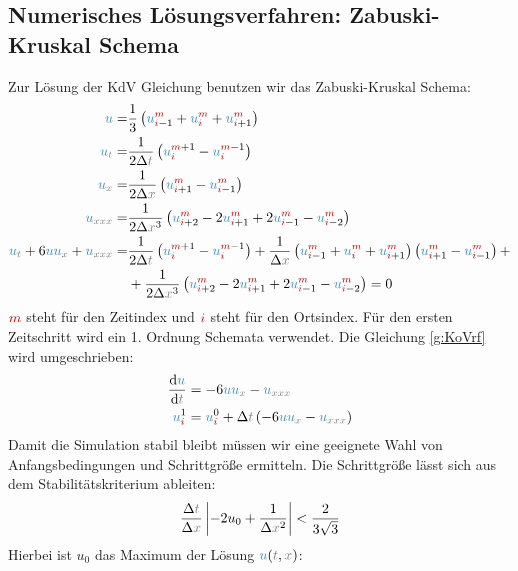 \documentclass[10pt,fleqn,%
reqno,a4paper]{article}
\makeatletter
\def\mathcolor#1#{\@mathcolor{#1}}
\def\@mathcolor#1#2#3{%
        \protect\leavevmode
        \begingroup\color#1{#2}#3\endgroup
}
\newcommand{\nx}{\mathcolor{gray}{x}}
\newcommand{\nt}{\mathcolor{gray}{t}}
\newcommand{\nnu}{\mathcolor{cyan!70!black}{u}}
\newcommand{\nni}{\mathcolor{red!70!black}{i}}
\newcommand{\nm}{\mathcolor{red!70!black}{m}}
\newcommand{\dif}{\mathrm{d}}
\makeatother
\begin{document}
\subsection{Numerisches Lösungsverfahren: Zabuski-Kruskal Schema}
Zur Lösung der KdV Gleichung benutzen wir das Zabuski-Kruskal Schema:
\begin{align}
        \nnu =& \frac{1}{3} \left(\nnu{_{\nni-1} ^{\nm}} + \nnu{_{\nni}^{\nm}} + \nnu{_{\nni+1}^{\nm}} \right) \nonumber\\
        \nnu_{\nt}=& \frac{1}{2\Delta \nt} \left(\nnu{_{\nni}^{\nm+1}} - \nnu{_{\nni}^{\nm-1}} \right) \nonumber\\
        \nnu_{\nx} = &\frac{1}{2\Delta \nx} \left(\nnu{_{\nni+1}^{\nm}} - \nnu{_{\nni-1}^{\nm}} \right) \nonumber\\
        \nnu _{\nx \nx \nx } =& \frac{1}{2\Delta \nx^3} \left(\nnu{_{\nni+2}^{\nm}} - 2\nnu{_{\nni+1}^{\nm}} + 2\nnu{_{\nni-1}^{\nm}}- \nnu{_{\nni-2}^{\nm}} \right) \nonumber \\
        \nnu _{\nt} + 6\nnu \nnu _{\nx} + \nnu _{\nx \nx \nx} = & \frac{1}{2\Delta \nt}  \left(\nnu{_{\nni}^{\nm+1}} - \nnu{_{\nni}^{\nm-1}} \right) + \frac{1}{\Delta \nx} \left(\nnu{_{\nni-1} ^{\nm}} + \nnu{_{\nni}^{\nm}} + \nnu{_{\nni+1}^{\nm}} \right) \left(\nnu{_{\nni+1}^{\nm}} - \nnu{_{\nni-1}^{\nm}} \right) +  \nonumber \\
 &      + \frac{1}{2\Delta \nx^3} \left(\nnu{_{\nni+2}^{\nm}} - 2\nnu{_{\nni+1}^{\nm}} + 2\nnu{_{\nni-1}^{\nm}}- \nnu{_{\nni-2}^{\nm}} \right) = 0 \label{eq:NumZabKru}
\end{align}
$ \nm $ steht für den Zeitindex und $ \nni $ steht für den Ortsindex. 
Für den ersten Zeitschritt wird ein 1. Ordnung Schemata verwendet.
Die Gleichung \ref{g:KoVrf} wird umgeschrieben:
\begin{align*}
        \frac{\dif \nnu}{\dif \nt} & = -6\nnu \nnu _{\nx} - \nnu _{\nx \nx \nx } \nonumber \\
        \nnu _{\nni} ^{1} & = \nnu _{\nni} ^{0} + \Delta \nt \left( -6\nnu \nnu _{\nx} - \nnu _{\nx \nx \nx } \right)
\end{align*}
Damit die Simulation stabil bleibt müssen wir eine geeignete Wahl von Anfangsbedingungen und Schrittgröße ermitteln. 
Die Schrittgröße lässt sich aus dem Stabilitätskriterium ableiten:
\begin{align}
        \frac{\Delta \nt}{\Delta \nx} \left| -2u _{0} +\frac{1}{\Delta \nx^{2}} \right| < \frac{2}{3\sqrt{3}} \label{eq:StaKri}
\end{align}
Hierbei ist $ u _{0} $ das Maximum der Lösung $ \nnu (\nt,\nx) $:
\end{document}
